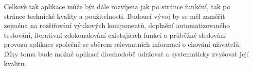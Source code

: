 Celkově tak aplikace může být dále rozvíjena jak po stránce funkční, tak po stránce technické kvality a použitelnosti. Budoucí vývoj by se měl zaměřit zejména na rozšiřování výukových komponentů, doplnění automatizovaného testování, iterativní zdokonalování existujících funkcí a průběžné sledování provozu aplikace společně se sběrem relevantních informací o chování uživatelů. Díky tomu bude možné aplikaci dlouhodobě udržovat a systematicky zvyšovat její kvalitu.
